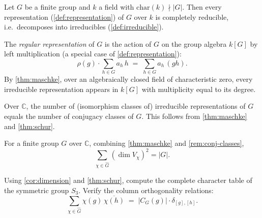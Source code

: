 \begin{theorem}
\label{thm:maschke}
Let $G$ be a finite group and $k$ a field with $\mathrm{char}(k) \nmid |G|$.
Then every representation (\ref{def:representation}) of $G$ over $k$ is
completely reducible, i.e.\ decomposes into irreducibles (\ref{def:irreducible}).
\end{theorem}

\begin{example}
\label{ex:regular}
The \textit{regular representation} of $G$ is the action of $G$ on the group
algebra $k[G]$ by left multiplication (a special case of \ref{def:representation}):
\[
  \rho(g) \cdot \sum_{h \in G} a_h \, h \;=\; \sum_{h \in G} a_h \, (gh).
\]
By \ref{thm:maschke}, over an algebraically closed field of characteristic zero,
every irreducible representation appears in $k[G]$ with multiplicity equal to
its degree.
\end{example}

\begin{remark}
\label{rem:conj-classes}
Over $\mathbb{C}$, the number of (isomorphism classes of) irreducible
representations of $G$ equals the number of conjugacy classes of $G$.
This follows from \ref{thm:maschke} and \ref{thm:schur}.
\end{remark}

\begin{corollary}
\label{cor:dimension}
For a finite group $G$ over $\mathbb{C}$, combining \ref{thm:maschke} and
\ref{rem:conj-classes},
\[
  \sum_{\chi \in \hat{G}} (\dim V_\chi)^2 = |G|.
\]
\end{corollary}

\begin{problem}
\label{prob:s3}
Using \ref{cor:dimension} and \ref{thm:schur}, compute the complete character
table of the symmetric group $S_3$.
Verify the column orthogonality relations:
\[
  \sum_{\chi \in \hat{G}} \chi(g)\,\overline{\chi(h)}
  \;=\; |C_G(g)| \cdot \delta_{[g],[h]}.
\]
\end{problem}
